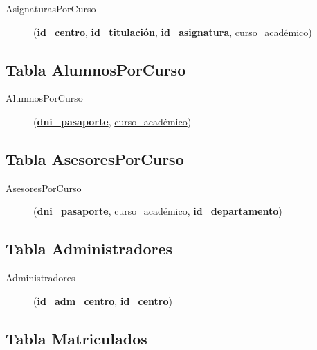       \begin{description}
         \item[AsignaturasPorCurso] \begin{flushleft}(\underline{\textbf{id\_centro}},
         \underline{\textbf{id\_titulación}}, \underline{\textbf{id\_asignatura}},
         \underline{curso\_académico})\end{flushleft}
      \end{description}

   \subsection{Tabla AlumnosPorCurso}

      \begin{description}
         \item[AlumnosPorCurso] \begin{flushleft}(\underline{\textbf{dni\_pasaporte}},
         \underline{curso\_académico})\end{flushleft}
      \end{description}


   \subsection{Tabla AsesoresPorCurso}

      \begin{description}
         \item[AsesoresPorCurso] \begin{flushleft}(\underline{\textbf{dni\_pasaporte}},
         \underline{curso\_académico}, \underline{\textbf{id\_departamento}})
         \end{flushleft}
      \end{description}

   \subsection{Tabla Administradores}

      \begin{description}
         \item[Administradores] \begin{flushleft}(\underline{\textbf{id\_adm\_centro}},
         \underline{\textbf{id\_centro}})\end{flushleft}
      \end{description}

   \subsection{Tabla Matriculados}

